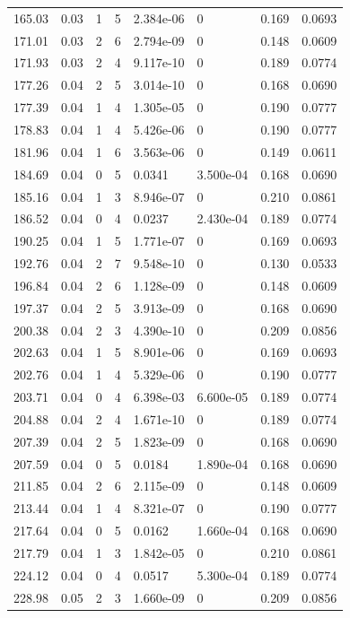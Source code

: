 \documentclass[preview]{standalone}
\begin{document}
{{{\begin{tabular}{L{1.2cm}C{1.2cm} C{0.3cm}C{0.5cm} C{1.4cm}C{1.4cm} C{1.4cm}C{1.4cm}}
  165.03  &  0.03  & 1     &  5 &  2.384e-06  & 0  & 0.169 &  0.0693   \\ 
  171.01  &  0.03  & 2     &  6 &  2.794e-09  & 0  & 0.148 &  0.0609   \\ 
  171.93  &  0.03  & 2     &  4 &  9.117e-10  & 0  & 0.189 &  0.0774   \\ 
  177.26  &  0.04  & 2     &  5 &  3.014e-10  & 0  & 0.168 &  0.0690   \\ 
  177.39  &  0.04  & 1     &  4 &  1.305e-05  & 0  & 0.190 &  0.0777   \\ 
  178.83  &  0.04  & 1     &  4 &  5.426e-06  & 0  & 0.190 &  0.0777   \\ 
  181.96  &  0.04  & 1     &  6 &  3.563e-06  & 0  & 0.149 &  0.0611   \\ 
  184.69  &  0.04  & 0     &  5 &  0.0341  & 3.500e-04  & 0.168 &  0.0690   \\ 
  185.16  &  0.04  & 1     &  3 &  8.946e-07  & 0  & 0.210 &  0.0861   \\ 
  186.52  &  0.04  & 0     &  4 &  0.0237  & 2.430e-04  & 0.189 &  0.0774   \\ 
  190.25  &  0.04  & 1     &  5 &  1.771e-07  & 0  & 0.169 &  0.0693   \\ 
  192.76  &  0.04  & 2     &  7 &  9.548e-10  & 0  & 0.130 &  0.0533   \\ 
  196.84  &  0.04  & 2     &  6 &  1.128e-09  & 0  & 0.148 &  0.0609   \\ 
  197.37  &  0.04  & 2     &  5 &  3.913e-09  & 0  & 0.168 &  0.0690   \\ 
  200.38  &  0.04  & 2     &  3 &  4.390e-10  & 0  & 0.209 &  0.0856   \\ 
  202.63  &  0.04  & 1     &  5 &  8.901e-06  & 0  & 0.169 &  0.0693   \\ 
  202.76  &  0.04  & 1     &  4 &  5.329e-06  & 0  & 0.190 &  0.0777   \\ 
  203.71  &  0.04  & 0     &  4 &  6.398e-03  & 6.600e-05  & 0.189 &  0.0774   \\ 
  204.88  &  0.04  & 2     &  4 &  1.671e-10  & 0  & 0.189 &  0.0774   \\ 
  207.39  &  0.04  & 2     &  5 &  1.823e-09  & 0  & 0.168 &  0.0690   \\ 
  207.59  &  0.04  & 0     &  5 &  0.0184  & 1.890e-04  & 0.168 &  0.0690   \\ 
  211.85  &  0.04  & 2     &  6 &  2.115e-09  & 0  & 0.148 &  0.0609   \\ 
  213.44  &  0.04  & 1     &  4 &  8.321e-07  & 0  & 0.190 &  0.0777   \\ 
  217.64  &  0.04  & 0     &  5 &  0.0162  & 1.660e-04  & 0.168 &  0.0690   \\ 
  217.79  &  0.04  & 1     &  3 &  1.842e-05  & 0  & 0.210 &  0.0861   \\ 
  224.12  &  0.04  & 0     &  4 &  0.0517  & 5.300e-04  & 0.189 &  0.0774   \\ 
  228.98  &  0.05  & 2     &  3 &  1.660e-09  & 0  & 0.209 &  0.0856   \\ 
\hline 
\end{tabular} 

}}}
\end{document}
